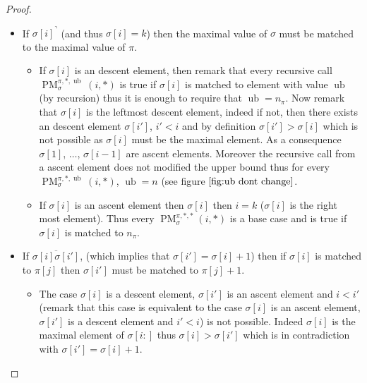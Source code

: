 \documentclass[a4paper]{llncs}
\newcommand{\ptext}{\pi}
\newcommand{\ppattern}{\sigma}
\DeclareMathOperator{\PMa}{PM}
\newcommand{\PM}[6]{\PMa_{{#1}}^{{#2},{#3},{#4}}({#5},{#6})}
\DeclareMathOperator{\ub}{ub}
\begin{document}
\begin{proof}
\begin{itemize}
\begin{itemize}
	\end{itemize}




	\item If ${\ppattern[i]}^\urcorner$ (and thus $\sigma[i]=k$) then the maximal value of $\ppattern$ must be matched to the maximal value of $\ptext$.
	\begin{itemize}

		\item If $\sigma[i]$ is an descent element, then remark that 
		every recursive call \\ $\PM{\sigma}{\ptext}{*}{\ub}{i}{*}$ is true if $\sigma[i]$ is matched to element with value $\ub$ (by recursion) thus it is enough to require that $\ub=n_{\ptext}$.
		Now remark that $\sigma[i]$ is the leftmost descent element, indeed if not, then there exists an descent element $\sigma[i']$, $i'<i$ and by definition $\sigma[i']>\sigma[i]$ which is not possible as $\sigma[i]$ must be the maximal element.
		As a consequence $\sigma[1]$, $\ldots$, $\sigma[i-1]$ are ascent elements.
		Moreover the recursive call from a ascent element does not modified the upper bound
		thus for every $\PM{\sigma}{\ptext}{*}{\ub}{i}{*}$, $\ub=n$ (see figure $\ref{fig:ub dont change}$. 	
		
		
		\item If $\sigma[i]$ is an ascent element then $\sigma[i]$ then $i=k$ ($\sigma[i]$ is the right most element). Thus every $\PM{\sigma}{\ptext}{*}{*}{i}{*}$ is a base case and is true if $\sigma[i]$ is matched to $n_{\ptext}$.

	\end{itemize}



	\item  If $\overline{\ppattern[i]\ppattern[i']}$,  (which implies that $\ppattern[i']=\ppattern[i]+1$) then if $\ppattern[i]$ is matched to $\ptext[j]$ then $\ppattern[i']$ must be matched to $\ptext[j]+1$.
		\begin{itemize}

			\item The case $\ppattern[i]$ is a descent element, $\ppattern[i']$ is an ascent element and $i<i'$ (remark that this case is equivalent to the case $\ppattern[i]$ is an ascent element, $\ppattern[i']$ is a descent element and $i'<i$) is not possible. 
			Indeed $\ppattern[i]$ is the maximal element of $\ppattern[i:]$ thus $\ppattern[i] > \ppattern[i']$ which is in contradiction with 
			$\ppattern[i']=\ppattern[i]+1$. 
			

\end{itemize}
\end{itemize}
\end{proof}
\end{document}

